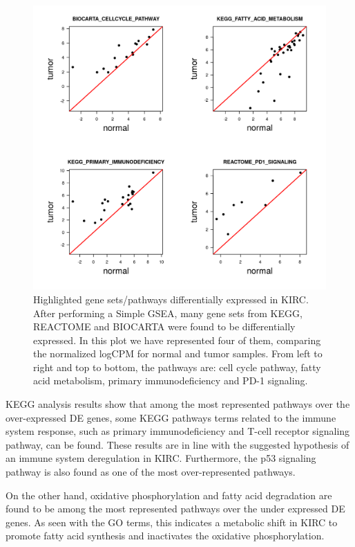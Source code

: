 \documentclass[9pt,twocolumn,twoside]{gsajnl}
\begin{document}
\begin{figure}[htbp]
\centering
\includegraphics[width=\linewidth]{figures/fig3.png}
\caption{Highlighted gene sets/pathways differentially expressed in KIRC. After performing a Simple GSEA, many gene sets from KEGG, REACTOME and BIOCARTA were found to be differentially expressed. In this plot we have represented four of them, comparing the normalized logCPM for normal and tumor samples. From left to right and top to bottom, the pathways are: cell cycle pathway, fatty acid metabolism, primary immunodeficiency and PD-1 signaling.}%
\label{fig:spectrum}
\end{figure}


KEGG analysis results show that among the most represented pathways over the over-expressed DE genes, some KEGG pathways terms related to the immune system response, such as primary immunodeficiency and T-cell receptor signaling pathway, can be found.  These results are in line with the suggested hypothesis of an immune system deregulation in KIRC. Furthermore, the p53 signaling pathway is also found as one of the most over-represented pathways.

On the other hand, oxidative phosphorylation and fatty acid degradation are found to be among the most represented pathways over the under expressed DE genes. As seen with the GO terms, this indicates a metabolic shift in KIRC to promote fatty acid synthesis and inactivates the oxidative phosphorylation.
\end{document}
